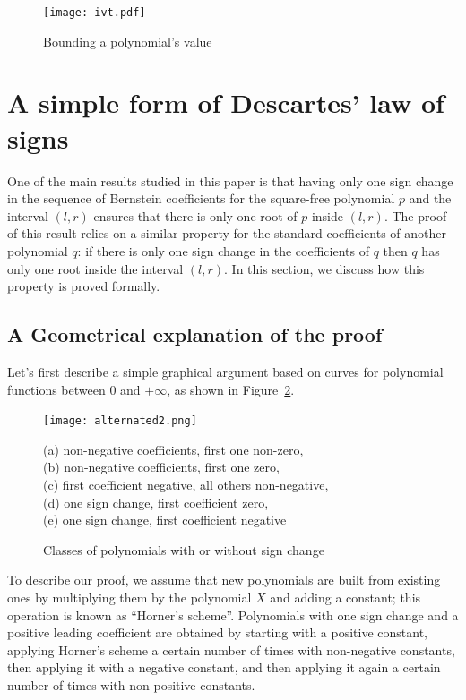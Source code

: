 \documentclass{mscs}
\begin{document}
\begin{figure}[h]
\begin{center}
\texttt{[image: ivt.pdf]}
\caption{\label{ivt} Bounding a polynomial's value}
\end{center}
\end{figure}
\section{A simple form of Descartes' law of signs}\label{sec:descartes}
One of the main results studied in this paper
is that having only one sign change in the
sequence of Bernstein coefficients for the square-free polynomial \(p\) and the
interval \((l,r)\) ensures that there is only one root of \(p\) inside
\((l,r)\).  The proof of this result relies on a similar property for
the standard coefficients of another polynomial \(q\): if there is
only one sign change in the coefficients of \(q\) then \(q\) has
only one root inside the interval \((l,r)\).  In this section, we
discuss how this property is proved formally.

\subsection{A Geometrical explanation of the proof}
Let's first describe a simple graphical argument based on curves for
polynomial functions between 0 and \(+\infty\), as shown in
Figure~\ref{graph-desc}.
\begin{figure}
\begin{center}
\texttt{[image: alternated2.png]}
\end{center}
{(a) non-negative coefficients, first one non-zero,\\
(b) non-negative coefficients, first one zero,\\
(c) first coefficient negative, all others non-negative,\\
(d) one sign change, first coefficient zero,\\
(e) one sign change, first coefficient negative}

\caption{\label{graph-desc}
Classes of polynomials with or without
sign change}
\end{figure}
To describe our proof, we assume that new polynomials are built from
existing ones by multiplying them by the polynomial \(X\) and adding a
constant; this operation is known as ``Horner's scheme''.
Polynomials with one sign change and a positive leading coefficient
are obtained by starting with a positive constant, applying Horner's
scheme a certain number of times with non-negative constants, then
applying it with a negative constant, and then applying it again a certain
number of times with non-positive constants.
\end{document}
